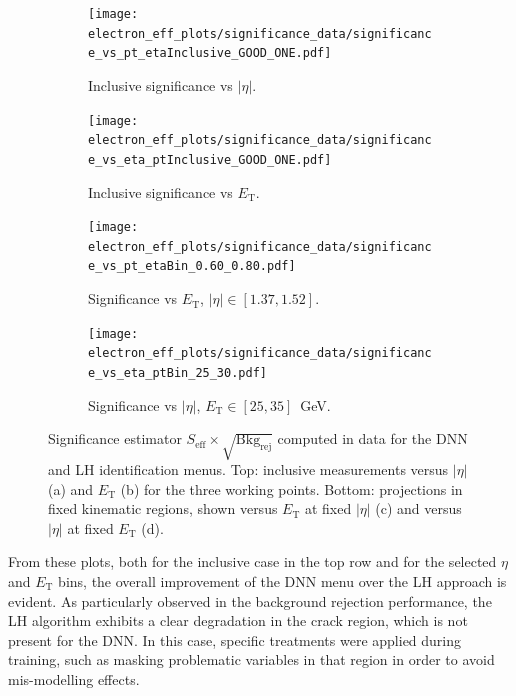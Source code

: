 \begin{figure}[htbp]
  \centering

  \begin{subfigure}{0.48\textwidth}
    \centering
    \texttt{[image: electron\_eff\_plots/significance\_data/significance\_vs\_pt\_etaInclusive\_GOOD\_ONE.pdf]}
    \caption{\small{Inclusive significance vs $|\eta|$.}}
    \label{fig:significance_inclusive_eta}
  \end{subfigure}\hfill
  \begin{subfigure}{0.48\textwidth}
    \centering
    \texttt{[image: electron\_eff\_plots/significance\_data/significance\_vs\_eta\_ptInclusive\_GOOD\_ONE.pdf]}
    \caption{\small{Inclusive significance vs $E_{\mathrm{T}}$.}}
    \label{fig:significance_inclusive_pt}
  \end{subfigure}

  \vspace{0.55cm}

  \begin{subfigure}{0.48\textwidth}
    \centering
    \texttt{[image: electron\_eff\_plots/significance\_data/significance\_vs\_pt\_etaBin\_0.60\_0.80.pdf]}
    \caption{\small{Significance vs $E_{\mathrm{T}}$, $|\eta|\in[1.37,1.52]$.}}
    \label{fig:significance_vs_pt_etaBin}
  \end{subfigure}\hfill
  \begin{subfigure}{0.48\textwidth}
    \centering
    \texttt{[image: electron\_eff\_plots/significance\_data/significance\_vs\_eta\_ptBin\_25\_30.pdf]}
    \caption{\small{Significance vs $|\eta|$, $E_{\mathrm{T}}\in[25,35]$~GeV.}}
    \label{fig:significance_vs_eta_ptBin}
  \end{subfigure}

  \caption{Significance estimator $S_{\mathrm{eff}} \times \sqrt{\mathrm{Bkg}_{\mathrm{rej}}}$ computed in data for the DNN and LH identification menus. Top: inclusive measurements versus $|\eta|$ (a) and $E_{\mathrm{T}}$ (b) for the three working points. Bottom: projections in fixed kinematic regions, shown versus $E_{\mathrm{T}}$ at fixed $|\eta|$ (c) and versus $|\eta|$ at fixed $E_{\mathrm{T}}$ (d).}
  \label{fig:significance_block}
\end{figure}

From these plots, both for the inclusive case in the top row and for the selected $\eta$ and $E_{\mathrm{T}}$ bins, the overall improvement of the DNN menu over the LH approach is evident. 
As particularly observed in the background rejection performance, the LH algorithm exhibits a clear degradation in the crack region, which is not present for the DNN. In this case, specific treatments were applied during training, such as masking problematic variables in that region in order to avoid mis-modelling effects.  

